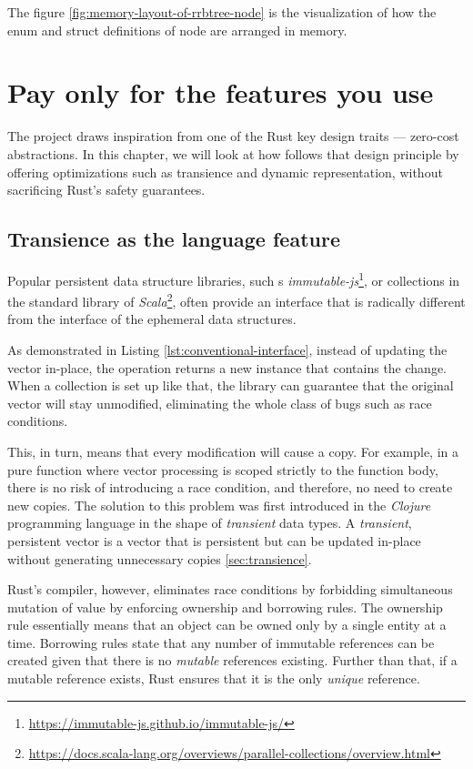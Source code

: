 The figure \ref{fig:memory-layout-of-rrbtree-node} is the visualization of how the enum and struct definitions of \rrbtree{} node are arranged in memory.

\section{Pay only for the features you use}
The \pvecrs{} project draws inspiration from one of the Rust key design traits --- zero-cost abstractions. In this chapter, we will look at how \pvec{} follows that design principle by offering optimizations such as transience and dynamic representation, without sacrificing Rust's safety guarantees.

\subsection{Transience as the language feature}
Popular persistent data structure libraries, such s \emph{immutable-js}\footnote{\url{https://immutable-js.github.io/immutable-js/}}, or collections in the standard library of \emph{Scala}\footnote{\url{https://docs.scala-lang.org/overviews/parallel-collections/overview.html}}, often provide an interface that is radically different from the interface of the ephemeral data structures.

As demonstrated in Listing \ref{lst:conventional-interface}, instead of updating the vector in-place, the operation returns a new instance that contains the change. When a collection is set up like that, the library can guarantee that the original vector will stay unmodified, eliminating the whole class of bugs such as race conditions.

This, in turn, means that every modification will cause a copy. For example, in a pure function where vector processing is scoped strictly to the function body, there is no risk of introducing a race condition, and therefore, no need to create new copies. The solution to this problem was first introduced in the \emph{Clojure} programming language in the shape of \emph{transient} data types. A \emph{transient}, persistent vector is a vector that is persistent but can be updated in-place without generating unnecessary copies \ref{sec:transience}.

Rust's compiler, however, eliminates race conditions by forbidding simultaneous mutation of value by enforcing ownership and borrowing rules. The ownership rule essentially means that an object can be owned only by a single entity at a time. Borrowing rules state that any number of immutable references can be created given that there is no \emph{mutable} references existing. Further than that, if a mutable reference exists, Rust ensures that it is the only \emph{unique} reference.

